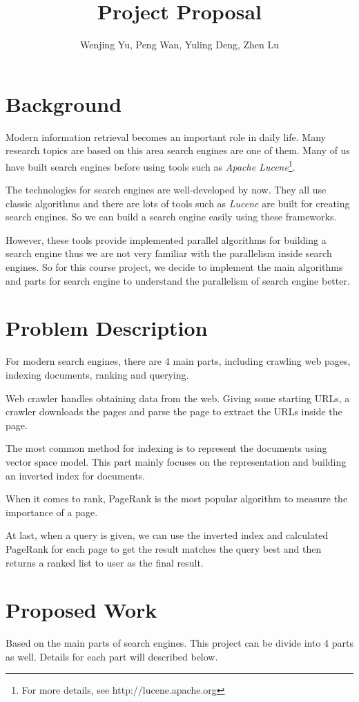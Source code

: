 \documentclass[11pt]{amsart}
\title{Project Proposal}
\author{Wenjing Yu, Peng Wan, Yuling Deng, Zhen Lu}
\begin{document}
\maketitle
\section{Background}
Modern information retrieval becomes an important role in daily life. Many research topics
are based on this area search engines are one of them. Many of us have built search engines 
before using tools such as \emph{Apache Lucene}\footnote{For more details, see 
http://lucene.apache.org}. 

The technologies for search engines are well-developed by now. They all use classic algorithms and
there are lots of tools such as \emph{Lucene} are built for creating search engines. So we can
build a search engine easily using these frameworks.

However, these tools provide implemented parallel algorithms for building a search engine thus we are
not very familiar with the parallelism inside search engines. So for this course project, we 
decide to implement the main algorithms and parts for search engine to understand the parallelism 
of search engine better.

\section{Problem Description}
For modern search engines, there are 4 main parts, including crawling web pages, indexing documents, 
ranking and querying. 

Web crawler handles obtaining data from the web. Giving some starting URLs, a crawler downloads the
pages and parse the page to extract the URLs inside the page. 

The most common method for indexing is to represent the documents using vector space model. This part
mainly focuses on the representation and building an inverted index for documents.

When it comes to rank, PageRank is the most popular algorithm to measure the importance of a page. 

At last, when a query is given, we can use the inverted index and calculated PageRank for each page
to get the result matches the query best and then returns a ranked list to user as the final result.

\section{Proposed Work}
Based on the main parts of search engines. This project can be divide into 4 parts as well. Details
for each part will described below.
\end{document}
